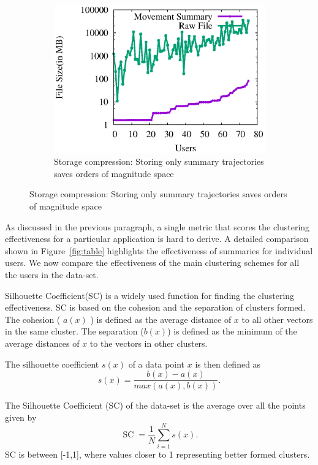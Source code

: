 \begin{figure}
\begin{subfigure}[t]{.32\textwidth}
\includegraphics[scale=0.4]{figs/size_line.eps}
\caption{Storage compression: Storing only summary trajectories saves orders of magnitude space}
\label{fig:size_line}  
\end{subfigure}
\label{fig:sil}  
\end{figure}

As discussed in the previous paragraph, a single metric that scores the clustering effectiveness for a particular application is hard to derive. A detailed comparison shown in Figure~\ref{fig:table} highlights the effectiveness of summaries for individual users. We now compare the effectiveness of the main clustering schemes for all the users in the data-set. 

Silhouette Coefficient(SC) is a widely used function for finding the clustering effectiveness. SC is based on the cohesion and the separation of clusters formed. The cohesion ( $a(x)$ )  is defined as the average distance of $x$ to all other vectors in the same cluster. The separation ($b(x)$) is defined as the minimum of the average distances of $x$ to the vectors in other clusters.

The silhouette coefficient $s(x)$ of a data point $x$ is then defined as 
\begin{equation}
s(x)=\frac{b(x)-a(x)}{max(a(x),b(x))}.
\end{equation}

The Silhouette Coefficient (SC) of the data-set is the average over all the points given by
\begin{equation}
\operatorname{SC}=\frac{1}{N}\sum_{i=1}^{N}s(x).
\end{equation}
\noindent SC is between [-1,1], where values closer to 1 representing better formed clusters. 

